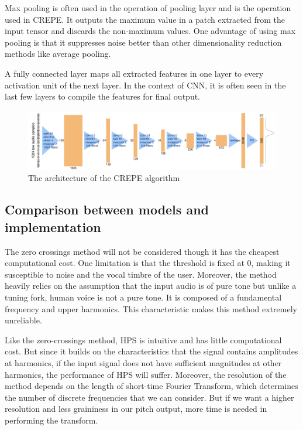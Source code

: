 \begin{enumerate}
	Max pooling is often used in the operation of pooling layer and is the operation used in CREPE. It outputs the maximum value in a patch extracted from the
	input tensor and discards the non-maximum values. 
	One advantage of using max pooling is that it suppresses noise better than other dimensionality reduction methods like average pooling.

	A fully connected layer maps all extracted features in one layer to every activation unit of the next layer. In the context of CNN, it is often seen in the
	last few layers to compile the features for final output.

	\begin{figure}
		\centering
		\includegraphics[width=0.8\columnwidth]{Figures/CREPE.png}
		\caption{The architecture of the CREPE algorithm}
		\label{CREPE}
	\end{figure}

\end{enumerate}

\subsection{Comparison between models and implementation}
The zero crossings method will not be considered though it has the cheapest computational cost. One limitation is that
the threshold is fixed at 0, making it susceptible to noise and the vocal timbre of the user. Moreover, the method heavily relies on
the assumption that the input audio is of pure tone but unlike a tuning fork, human voice is not a pure tone. It is 
composed of a fundamental frequency and upper harmonics.  This characteristic makes this method extremely
unreliable.

Like the zero-crossings method, HPS is intuitive and has little computational cost. But since it builds on the characteristics 
that the signal contains amplitudes at harmonics, if the input signal does not have sufficient magnitudes at other harmonics, the 
performance of HPS will suffer. Moreover, the resolution of the method depends on the length of short-time Fourier Transform, which
determines the number of discrete frequencies that we can consider. But if we want a higher resolution and less graininess in our 
pitch output, more time is needed in performing the transform.

